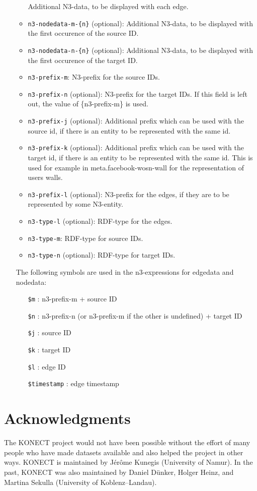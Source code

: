 \documentclass{article}
\begin{document}
\begin{itemize}
\begin{itemize}
    Additional N3-data, to be displayed with each
    edge.
  \item \texttt{n3-nodedata-m-\{n\}} (optional):
    Additional N3-data, to be displayed with the
    first occurence of the source ID.
  \item \texttt{n3-nodedata-n-\{n\}} (optional):
    Additional N3-data, to be displayed with the
    first occurence of the target ID.
  \item \texttt{n3-prefix-m}: N3-prefix for the
    source IDs.
  \item \texttt{n3-prefix-n} (optional): N3-prefix
    for the target IDs. If this field is left out,
    the value of \{n3-prefix-m\} is used.
  \item \texttt{n3-prefix-j} (optional):
    Additional prefix which can be used with the
    source id, if there is an entity to be
    represented with the same id.
  \item \texttt{n3-prefix-k} (optional):
    Additional prefix which can be used with the
    target id, if there is an entity to be
    represented with the same id. This is used for
    example in meta.facebook-wosn-wall for the
    representation of users walls.
  \item \texttt{n3-prefix-l} (optional): N3-prefix
    for the edges, if they are to be represented
    by some N3-entity.
  \item \texttt{n3-type-l} (optional): RDF-type
    for the edges.
  \item \texttt{n3-type-m}: RDF-type for source
    IDs.
  \item \texttt{n3-type-n} (optional): RDF-type
    for target IDs.
  \end{itemize}
  The following symbols are used in the n3-expressions for
  edgedata and nodedata:
  \begin{itemize}
  \item[\texttt{\$m}]: n3-prefix-m + source ID
  \item[\texttt{\$n}]: n3-prefix-n (or n3-prefix-m
    if the other is undefined) + target ID
  \item[\texttt{\$j}]: source ID
  \item[\texttt{\$k}]: target ID
  \item[\texttt{\$l}]: edge ID
  \item[\texttt{\$timestamp}]: edge timestamp
  \end{itemize}
\end{itemize}

\section*{Acknowledgments}
The KONECT project would not have been possible without the
effort of many people who have made datasets available and also helped
the project in other ways.   
KONECT is maintained by Jérôme Kunegis (University of Namur). 
In the past, KONECT was also maintained by Daniel Dünker, Holger Heinz,
and Martina Sekulla (University of Koblenz--Landau). 
\end{document}
